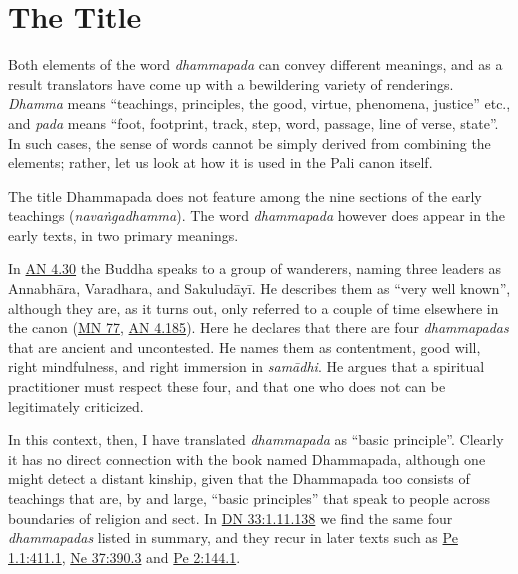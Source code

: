 \documentclass[12pt,openany]{book}%
\begin{document}
\section*{The Title}

Both elements of the word \textit{dhammapada} can convey different meanings, and as a result translators have come up with a bewildering variety of renderings. \textit{Dhamma} means “teachings, principles, the good, virtue, phenomena, justice” etc.,  and \textit{pada} means “foot, footprint, track, step, word, passage, line of verse, state”. In such cases, the sense of words cannot be simply derived from combining the elements; rather, let us look at how it is used in the Pali canon itself.

The title Dhammapada does not feature among the nine sections of the early teachings (\textit{\textsanskrit{navaṅgadhamma}}). The word \textit{dhammapada} however does appear in the early texts, in two primary meanings.

In \href{https://suttacentral.net/an4.30/en/sujato}{AN 4.30} the Buddha speaks to a group of wanderers, naming three leaders as \textsanskrit{Annabhāra}, Varadhara, and \textsanskrit{Sakuludāyī}. He describes them as “very well known”, although they are, as it turns out, only referred to a couple of time elsewhere in the canon (\href{https://suttacentral.net/mn77/en/sujato}{MN 77}, \href{https://suttacentral.net/an4.185/en/sujato}{AN 4.185}). Here he declares that there are four \textit{dhammapadas} that are ancient and uncontested. He names them as contentment, good will, right mindfulness, and right immersion in \textit{\textsanskrit{samādhi}}. He argues that a spiritual practitioner must respect these four, and that one who does not can be legitimately criticized.

In this context, then, I have translated \textit{dhammapada} as “basic principle”. Clearly it has no direct connection with the book named Dhammapada, although one might detect a distant kinship, given that the Dhammapada too consists of teachings that are, by and large, “basic principles” that speak to people across boundaries of religion and sect. In \href{https://suttacentral.net/dn33/en/sujato\#1.11.138}{DN 33:1.11.138} we find the same four \textit{dhammapadas} listed in summary, and they recur in later texts such as \href{https://suttacentral.net/ps1.1/pli/ms\#411.1}{Pe 1.1:411.1}, \href{https://suttacentral.net/ne37/pli/ms\#390.3}{Ne 37:390.3} and \href{https://suttacentral.net/pe2/pli/ms\#144.1}{Pe 2:144.1}.
\end{document}
